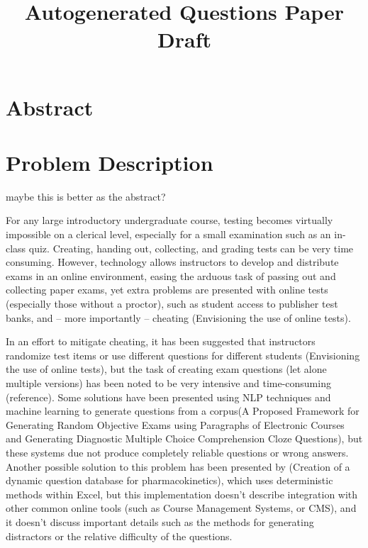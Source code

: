 \documentclass{article}
\title{Autogenerated Questions Paper Draft}
\date{ }
\begin{document}
\maketitle

\tableofcontents

\section{Abstract} \label{sec-abstract}

\section{Problem Description} \label{sec-problem_description}

maybe this is better as the abstract?

For any large introductory undergraduate course, testing becomes virtually impossible on a clerical level, especially for a small examination
such as an in-class quiz. Creating, handing out, collecting, and grading tests can be very time consuming. However, technology allows instructors to develop and distribute exams in an online environment,
easing the arduous task of passing out and collecting paper exams, yet extra problems are presented with online tests (especially those
without a proctor), such as student access to publisher test banks, and -- more importantly -- cheating (Envisioning the use of online tests). 

In an effort to mitigate cheating, it has been suggested that instructors randomize test items or use different questions for different students (Envisioning the use of online tests), but the task of creating exam
questions (let alone multiple versions) has been noted to be very intensive and time-consuming (reference). Some solutions have been presented using NLP techniques and machine learning  to generate questions from a corpus(A Proposed Framework for Generating Random
Objective Exams using Paragraphs of Electronic
Courses and Generating Diagnostic Multiple Choice Comprehension Cloze Questions), but these systems due not produce completely reliable questions or wrong answers. Another possible solution to this problem has been
presented by (Creation of a dynamic question database for pharmacokinetics), which uses deterministic methods within Excel, but this implementation doesn't describe integration with other common online tools (such as Course Management Systems, or CMS), and it doesn't discuss important details such as
the methods for generating distractors or the relative difficulty of the questions.
\end{document}
